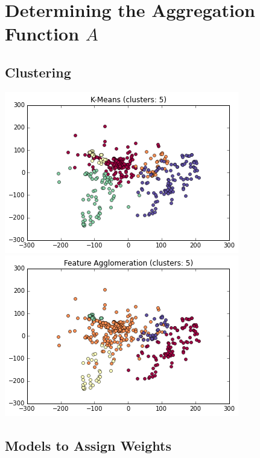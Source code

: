 \documentclass[paper.tex]{subfiles}
\begin{document}
	\section{Determining the Aggregation Function $A$}
	\subsection{Clustering}

	\includegraphics[width=0.5\linewidth]{images/clusters_km_5.png}
	\includegraphics[width=0.5\linewidth]{images/clusters_fa_5.png}
		
	\subsection{Models to Assign Weights}
	
\end{document}
